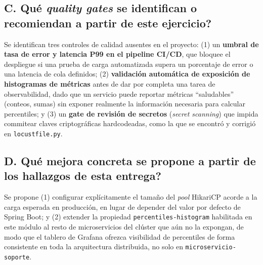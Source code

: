﻿\documentclass[11pt,a4paper]{article}
\begin{document}
\subsection*{C. \textquestiondown Qu\'e \textit{quality gates} se identifican o recomiendan a partir de este ejercicio?}
Se identifican tres controles de calidad ausentes en el proyecto: (1) un \textbf{umbral de tasa de error y latencia P99 en el pipeline CI/CD}, que bloquee el despliegue si una prueba de carga automatizada supera un porcentaje de error o una latencia de cola definidos; (2) \textbf{validaci\'on autom\'atica de exposici\'on de histogramas de m\'etricas} antes de dar por completa una tarea de observabilidad, dado que un servicio puede reportar m\'etricas ``saludables'' (conteos, sumas) sin exponer realmente la informaci\'on necesaria para calcular percentiles; y (3) un \textbf{gate de revisi\'on de secretos} (\textit{secret scanning}) que impida commitear claves criptogr\'aficas hardcodeadas, como la que se encontr\'o y corrigi\'o en \texttt{locustfile.py}.

\subsection*{D. \textquestiondown Qu\'e mejora concreta se propone a partir de los hallazgos de esta entrega?}
Se propone (1) configurar expl\'icitamente el tama\~no del \textit{pool} HikariCP acorde a la carga esperada en producci\'on, en lugar de depender del valor por defecto de Spring Boot; y (2) extender la propiedad \texttt{percentiles-histogram} habilitada en este m\'odulo al resto de microservicios del cl\'uster que a\'un no la expongan, de modo que el tablero de Grafana ofrezca visibilidad de percentiles de forma consistente en toda la arquitectura distribuida, no solo en \texttt{microservicio-soporte}.

\end{document}

